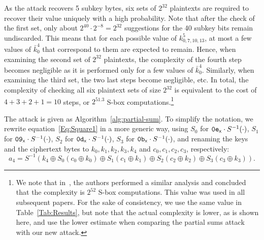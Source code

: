As the attack recovers 5 subkey bytes, six sets of $2^{32}$ plaintexts are required to recover their value uniquely with a high probability. Note that after the check of the first set, only about $2^{40} \cdot 2^{-8}=2^{32}$ suggestions for the 40 subkey bits remain undiscarded. This means that for each possible value of $k^5_{0,7,10,13}$, at most a few values of $\bar{k}^4_0$ that correspond to them are expected to remain. Hence, when examining the second set of $2^{32}$ plaintexts, the complexity of the fourth step becomes negligible as it is performed only for a few values of $\bar{k}^4_0$. Similarly, when examining the third set, the two last steps become negligible, etc. In total, the complexity of checking all six plaintext sets of size $2^{32}$ is equivalent to the cost of $4+3+2+1=10$ steps, or $2^{51.3}$ S-box computations.\footnote{We note that in~\cite{FSE:FKLSSWW00}, the authors performed a similar analysis and concluded that the complexity is $2^{52}$ S-box computations. This value was used in all subsequent papers. For the sake of consistency, we use the same value in Table~\ref{Tab:Results}, but note that the actual complexity is lower, as is shown here, and use the lower estimate when comparing the partial sums attack with our new attack.} 

The attack is given as Algorithm~\ref{alg:partial-sum}.
To simplify the notation, we rewrite equation~\eqref{Eq:Square1} in a more generic way, using
$S_0$ for $\mathtt{0e}_{\mathsf{x}} \cdot S^{-1}(\cdot)$,
$S_1$ for $\mathtt{09}_{\mathsf{x}} \cdot S^{-1}(\cdot)$,
$S_2$ for $\mathtt{0d}_{\mathsf{x}} \cdot S^{-1}(\cdot)$,
$S_3$ for $\mathtt{0b}_{\mathsf{x}} \cdot S^{-1}(\cdot)$,
and renaming the keys and the ciphertext bytes to $k_0, k_1, k_2, k_3, k_4$ and $c_0, c_1, c_2, c_3$, respectively:
\begin{equation}
    a_4 = S^{-1}\left(k_4 \oplus S_0(c_0 \oplus k_0) \oplus S_1(c_1 \oplus k_1) \oplus S_2(c_2 \oplus k_2) \oplus S_3(c_3 \oplus k_3)\right).
    \label{Eq:Square2}
\end{equation}

